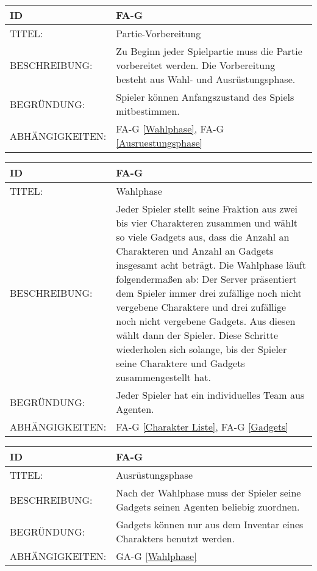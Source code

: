 \begin{tabularx}{16cm}{l|X}
	{table}\label{Partie-Vorbereitung}
	\textbf{ID} & \textbf{FA-G \arabic{table}} \\
	\hline
	TITEL: & Partie-Vorbereitung \\
	\hline
	BESCHREIBUNG: & Zu Beginn jeder Spielpartie muss die Partie vorbereitet werden. Die Vorbereitung besteht aus Wahl- und Ausrüstungsphase. \\
	\hline
	BEGRÜNDUNG: & Spieler können Anfangszustand des Spiels mitbestimmen. \\
	\hline
	ABHÄNGIGKEITEN: & FA-G \ref{Wahlphase}, FA-G \ref{Ausruestungsphase} \\
\end{tabularx}

\begin{tabularx}{16cm}{l|X}
	{table}\label{Wahlphase}
	\textbf{ID} & \textbf{FA-G \arabic{table}} \\
	\hline
	TITEL: & Wahlphase \\
	\hline
	BESCHREIBUNG: & Jeder Spieler stellt seine Fraktion aus zwei bis vier Charakteren zusammen und wählt so viele Gadgets aus, dass die Anzahl an Charakteren und Anzahl an Gadgets insgesamt acht beträgt.
	\newline Die Wahlphase läuft folgendermaßen ab: Der Server präsentiert dem Spieler immer drei zufällige noch nicht vergebene Charaktere und drei zufällige noch nicht vergebene Gadgets. Aus diesen wählt dann der Spieler.
	\newline Diese Schritte wiederholen sich solange, bis der Spieler seine Charaktere und Gadgets zusammengestellt hat.\\
	\hline
	BEGRÜNDUNG: & Jeder Spieler hat ein individuelles Team aus Agenten. \\
	\hline
	ABHÄNGIGKEITEN: &  FA-G \ref{Charakter Liste}, FA-G \ref{Gadgets}\\
\end{tabularx}

\begin{tabularx}{16cm}{l|X}
	{table}\label{Ausruestungsphase}
	\textbf{ID} & \textbf{FA-G \arabic{table}} \\
	\hline
	TITEL: & Ausrüstungsphase \\
	\hline
	BESCHREIBUNG: & Nach der Wahlphase muss der Spieler seine Gadgets seinen Agenten beliebig zuordnen.\\
	\hline
	BEGRÜNDUNG: & Gadgets können nur aus dem Inventar eines Charakters benutzt werden. \\
	\hline
	ABHÄNGIGKEITEN: & GA-G \ref{Wahlphase} \\
\end{tabularx}

